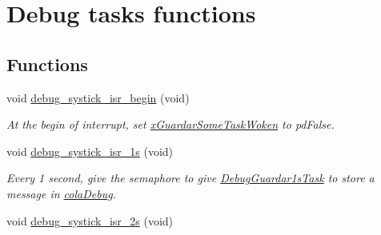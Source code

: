 \hypertarget{group___debug___exported___functions___group3}{}\section{Debug tasks functions}
\label{group___debug___exported___functions___group3}
\subsection*{Functions}
\begin{DoxyCompactItemize}
\item 
void \hyperlink{group___debug___exported___functions___group3_ga91fbb6e1bddf4466bb5517b7f85175ed}{debug\+\_\+systick\+\_\+isr\+\_\+begin} (void)\hypertarget{group___debug___exported___functions___group3_ga91fbb6e1bddf4466bb5517b7f85175ed}{}\label{group___debug___exported___functions___group3_ga91fbb6e1bddf4466bb5517b7f85175ed}

\begin{DoxyCompactList}\small\item\em At the begin of interrupt, set \hyperlink{group___debug___private___variables_ga5ab62a235f978d6271ac56aa61c477dd}{x\+Guardar\+Some\+Task\+Woken} to pd\+False. \end{DoxyCompactList}\item 
void \hyperlink{group___debug___exported___functions___group3_ga3fbeeb6f202ea5a58378bad352f15cf8}{debug\+\_\+systick\+\_\+isr\+\_\+1s} (void)\hypertarget{group___debug___exported___functions___group3_ga3fbeeb6f202ea5a58378bad352f15cf8}{}\label{group___debug___exported___functions___group3_ga3fbeeb6f202ea5a58378bad352f15cf8}

\begin{DoxyCompactList}\small\item\em Every 1 second, give the semaphore to give \hyperlink{group___debug___exported___functions___group3_ga5e54537eed1694dae3ea8e6cce3f9b3a}{Debug\+Guardar1s\+Task} to store a message in \hyperlink{group___cola_ga314fd637d927bd6a2551e119de623aa5}{cola\+Debug}. \end{DoxyCompactList}\item 
void \hyperlink{group___debug___exported___functions___group3_gafbcfc8eb9fcaa7fc213a6853d6a9f0e9}{debug\+\_\+systick\+\_\+isr\+\_\+2s} (void)\hypertarget{group___debug___exported___functions___group3_gafbcfc8eb9fcaa7fc213a6853d6a9f0e9}{}\label{group___debug___exported___functions___group3_gafbcfc8eb9fcaa7fc213a6853d6a9f0e9}


\end{DoxyCompactItemize}
